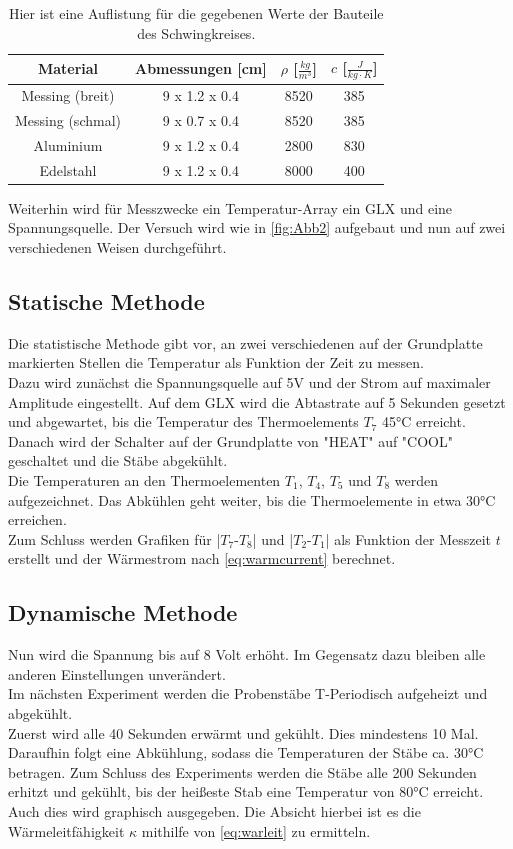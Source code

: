 \begin{table}
    \centering
    \caption{Hier ist eine Auflistung für die gegebenen Werte der Bauteile des Schwingkreises.}
    \label{tab:werte2}
    \begin{tabular}{c|c|c|c}
        Material & Abmessungen [cm] & $\rho$ [$\frac{kg}{m^3}$] & $c$ [$\frac{J}{kg\cdot K}$]\\
        \midrule
        Messing (breit) & 9 x 1.2 x 0.4 & 8520 & 385\\
        Messing (schmal) & 9 x 0.7 x 0.4 & 8520 & 385\\
        Aluminium & 9 x 1.2 x 0.4 & 2800 & 830\\
        Edelstahl & 9 x 1.2 x 0.4 & 8000 & 400\\
    \end{tabular}
  \end{table}

Weiterhin wird für Messzwecke ein Temperatur-Array ein GLX und eine Spannungsquelle. Der Versuch wird wie in \autoref{fig:Abb2} aufgebaut und nun auf zwei verschiedenen Weisen durchgeführt.

\subsection{Statische Methode}
  Die statistische Methode gibt vor, an zwei verschiedenen auf der Grundplatte markierten Stellen die Temperatur als Funktion der Zeit zu messen.\\
  Dazu wird zunächst die Spannungsquelle auf 5V und der Strom auf maximaler Amplitude eingestellt. Auf dem GLX wird die Abtastrate auf 5 Sekunden gesetzt und abgewartet, bis die Temperatur des Thermoelements \(T_7\) 45°C erreicht. Danach wird der Schalter auf der Grundplatte von "HEAT" auf "COOL" geschaltet und die Stäbe abgekühlt.\\
  Die Temperaturen an den Thermoelementen \(T_1\), \(T_4\), \(T_5\) und \(T_8\) werden aufgezeichnet. Das Abkühlen geht weiter, bis die Thermoelemente in etwa 30°C erreichen.\\
  Zum Schluss werden Grafiken für |\(T_7\)-\(T_8\)| und |\(T_2\)-\(T_1\)| als Funktion der Messzeit \(t\) erstellt und der Wärmestrom nach \autoref{eq:warmcurrent} berechnet.
  
\subsection{Dynamische Methode}
  Nun wird die Spannung bis auf 8 Volt erhöht. Im Gegensatz dazu bleiben alle anderen Einstellungen unverändert.\\
  Im nächsten Experiment werden die Probenstäbe T-Periodisch aufgeheizt und abgekühlt.\\
  Zuerst wird alle 40 Sekunden erwärmt und gekühlt. Dies mindestens 10 Mal. Daraufhin folgt eine Abkühlung, sodass die Temperaturen der Stäbe ca. 30°C betragen. Zum Schluss des Experiments werden die Stäbe alle 200 Sekunden erhitzt und gekühlt, bis der heißeste Stab eine Temperatur von 80°C erreicht. Auch dies wird graphisch ausgegeben. Die Absicht hierbei ist es die Wärmeleitfähigkeit \(\kappa\) mithilfe von \autoref{eq:warleit} zu ermitteln.